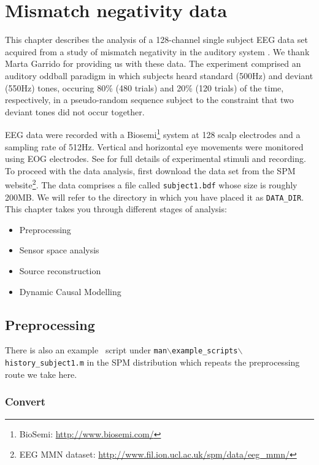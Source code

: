 \chapter{Mismatch negativity data \label{Chap:data:mmn}}

This chapter describes the analysis of a 128-channel single subject EEG data set acquired from a study of mismatch negativity in the auditory system \cite{marta_mmndcm}. We thank Marta Garrido for providing us with these data. The experiment comprised an auditory oddball paradigm in which subjects heard standard (500Hz) and deviant (550Hz) tones, occuring 80\% (480 trials) and 20\% (120 trials) of the time, respectively, in a pseudo-random sequence subject to the constraint that two deviant tones did not occur together.

EEG data were recorded with a Biosemi\footnote{BioSemi: \url{http://www.biosemi.com/}} system at 128 scalp electrodes and a sampling rate of 512Hz. Vertical and horizontal eye movements were monitored using EOG electrodes. See \cite{marta_mmndcm} for full details of experimental stimuli and recording. To proceed with the data analysis, first download the  data set from the SPM website\footnote{EEG MMN dataset: \url{http://www.fil.ion.ucl.ac.uk/spm/data/eeg\_mmn/}}. The data comprises a file called \texttt{subject1.bdf} whose size is roughly 200MB. We will refer to the directory in which you have placed it as \texttt{DATA\_DIR}. This chapter takes you through different stages of analysis:

\begin{itemize}
\item{Preprocessing}
\item{Sensor space analysis}
\item{Source reconstruction}
\item{Dynamic Causal Modelling}
\end{itemize}

\section{Preprocessing}

There is also an example \matlab\ script under \texttt{man$\backslash$example\_scripts$\backslash$history\_subject1.m} in the SPM distribution which repeats the preprocessing route we take here.

\subsection{Convert}

